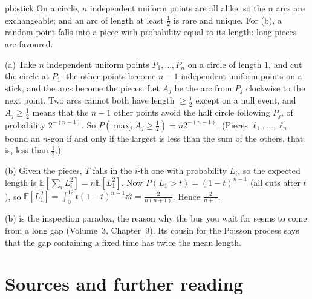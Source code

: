 \begin{solution}{pb:stick}
\idea On a circle, $n$ independent uniform points are all alike, so the $n$ arcs are exchangeable; and an arc of length at least $\frac12$
is rare and unique. For (b), a random point falls into a piece with probability equal to its length: long pieces are favoured.

\writeup (a) Take $n$ independent uniform points $P_1,\dots,P_n$ on a circle of length $1$, and cut the circle at $P_1$: the other points become
$n-1$ independent uniform points on a stick, and the arcs become the pieces. Let $A_j$ be the arc from $P_j$ clockwise to the next point.
Two arcs cannot both have length $\ge\frac12$ except on a null event, and $A_j\ge\frac12$ means that the $n-1$ other points avoid the half circle
following $P_j$, of probability $2^{-(n-1)}$. So $P(\max_jA_j\ge\frac12)=n2^{-(n-1)}$. (Pieces $\ell_1,\dots,\ell_n$ bound an $n$-gon if and only if the
largest is less than the sum of the others, that is, less than $\frac12$.)

(b) Given the pieces, $T$ falls in the $i$-th one with probability $L_i$, so the expected length is $\mathbb E[\sum_iL_i^2]=n\mathbb E[L_1^2]$. Now
$P(L_1>t)=(1-t)^{n-1}$ (all cuts after $t$), so $\mathbb E[L_1^2]=\int_0^12t(1-t)^{n-1}\dd t=\frac2{n(n+1)}$. Hence $\frac2{n+1}$.

\leads (b) is the inspection paradox, the reason why the bus you wait for seems to come from a long gap (Volume~3, Chapter~9). Its cousin for
the Poisson process says that the gap containing a fixed time has twice the mean length.
\end{solution}

\section*{Sources and further reading}

